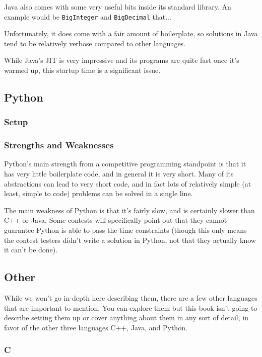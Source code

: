 Java also comes with some very useful bits inside its standard library. An example would be \texttt{BigInteger} and \texttt{BigDecimal} that...

Unfortunately, it does come with a fair amount of boilerplate, so solutions in Java tend to be relatively verbose compared to other languages.

While Java's JIT is very impressive and its programs are quite fast once it's warmed up, this startup time is a significant issue.

\subsection{Python}
\subsubsection{Setup}
\subsubsection{Strengths and Weaknesses}

Python's main strength from a competitive programming standpoint is that it has very little boilerplate code, and in general it is very short. Many of its abstractions can lead to very short code, and in fact lots of relatively simple (at least, simple to code) problems can be solved in a single line.

The main weakness of Python is that it's fairly slow, and is certainly slower than C++ or Java. Some contests will specifically point out that they cannot guarantee Python is able to pass the time constraints (though this only means the contest testers didn't write a solution in Python, not that they actually know it can't be done).

\subsection{Other}

While we won't go in-depth here describing them, there are a few other languages that are important to mention. You can explore them but this book isn't going to describe setting them up or cover anything about them in any sort of detail, in favor of the other three languages C++, Java, and Python.

\subsubsection{C}

